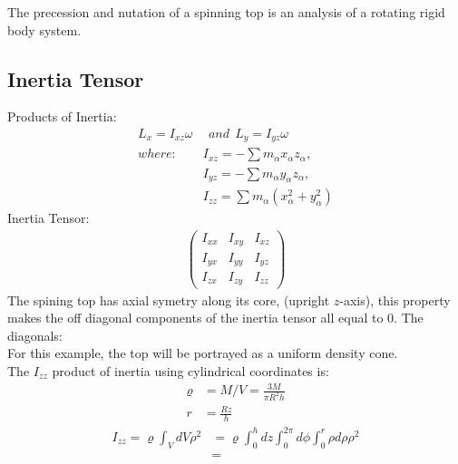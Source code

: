 \documentclass[a4paper,12pt]{article}
\begin{document}
The precession and nutation of a spinning top is an analysis of a rotating rigid body system.


\subsection*{Inertia Tensor}


Products of Inertia:
\begin{align*}
L_x=I_{xz}\omega&\ \ and\ \ L_y=I_{yz}\omega\\
where:\ \ &I_{xz}=-\sum m_\alpha x_\alpha z_\alpha,\\
&I_{yz}=-\sum m_\alpha y_\alpha z_\alpha,\\
&I_{zz}=\sum m_\alpha(x_\alpha^2+y_\alpha^2)
\end{align*}
Inertia Tensor:
\begin{align*}
\left( \begin{array}{ccc}
I_{xx} & I_{xy} & I_{xz}\\
I_{yx} & I_{yy} & I_{yz}\\
I_{zx} & I_{zy} & I_{zz} \end{array} \right)
\end{align*}
The spining top has axial symetry along its core, (upright $z$-axis), this property makes the off diagonal components of the inertia tensor all equal to 0.
The diagonals:
\\
For this example, the top will be portrayed as a uniform density cone.
\\
The $I_{zz}$ product of inertia using cylindrical coordinates is:
\begin{align*}
\varrho&=M/V=\frac{3M}{\pi R^2h}\\
r&=\frac{Rz}{h}
\end{align*}
\begin{align*}
I_{zz}=\varrho\int_{V}dV\rho^2&=\varrho\int_0^hdz\int_0^{2\pi}d\phi\int_0^r\rho d\rho\rho^2\\
&=
\end{align*}
\end{document}

